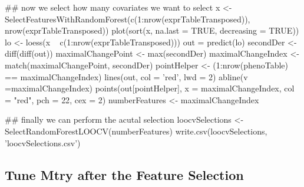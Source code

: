 \documentclass[]{article}
\newenvironment{Shaded}{\begin{snugshade}}{\end{snugshade}}
\newcommand{\CommentTok}[1]{\textcolor[rgb]{0.50,0.62,0.50}{#1}}
\newcommand{\DataTypeTok}[1]{\textcolor[rgb]{0.87,0.87,0.75}{#1}}
\newcommand{\DecValTok}[1]{\textcolor[rgb]{0.86,0.86,0.80}{#1}}
\newcommand{\KeywordTok}[1]{\textcolor[rgb]{0.94,0.87,0.69}{#1}}
\newcommand{\NormalTok}[1]{\textcolor[rgb]{0.80,0.80,0.80}{#1}}
\newcommand{\OperatorTok}[1]{\textcolor[rgb]{0.94,0.94,0.82}{#1}}
\newcommand{\OtherTok}[1]{\textcolor[rgb]{0.94,0.94,0.56}{#1}}
\newcommand{\StringTok}[1]{\textcolor[rgb]{0.80,0.58,0.58}{#1}}
\begin{document}
\begin{Shaded}
\begin{Highlighting}[]
\CommentTok{## now we select how many covariates we want to select}
\NormalTok{x <-}\StringTok{ }\KeywordTok{SelectFeaturesWithRandomForest}\NormalTok{(}\KeywordTok{c}\NormalTok{(}\DecValTok{1}\OperatorTok{:}\KeywordTok{nrow}\NormalTok{(exprTableTransposed)),}
                                    \KeywordTok{nrow}\NormalTok{(exprTableTransposed))}
\KeywordTok{plot}\NormalTok{(}\KeywordTok{sort}\NormalTok{(x, }\DataTypeTok{na.last =} \OtherTok{TRUE}\NormalTok{, }\DataTypeTok{decreasing =} \OtherTok{TRUE}\NormalTok{))}
\NormalTok{lo <-}\StringTok{ }\KeywordTok{loess}\NormalTok{(x }\OperatorTok{~}\StringTok{ }\KeywordTok{c}\NormalTok{(}\DecValTok{1}\OperatorTok{:}\KeywordTok{nrow}\NormalTok{(exprTableTransposed)))}
\NormalTok{out =}\StringTok{ }\KeywordTok{predict}\NormalTok{(lo)}
\NormalTok{secondDer <-}\StringTok{ }\KeywordTok{diff}\NormalTok{(}\KeywordTok{diff}\NormalTok{(out))}
\NormalTok{maximalChangePoint <-}\StringTok{ }\KeywordTok{max}\NormalTok{(secondDer)}
\NormalTok{maximalChangeIndex <-}\StringTok{ }\KeywordTok{match}\NormalTok{(maximalChangePoint, secondDer)}
\NormalTok{pointHelper <-}\StringTok{ }\NormalTok{(}\DecValTok{1}\OperatorTok{:}\KeywordTok{nrow}\NormalTok{(phenoTable) }\OperatorTok{==}\StringTok{ }\NormalTok{maximalChangeIndex)}
\KeywordTok{lines}\NormalTok{(out, }\DataTypeTok{col =} \StringTok{'red'}\NormalTok{, }\DataTypeTok{lwd =} \DecValTok{2}\NormalTok{)}
\KeywordTok{abline}\NormalTok{(}\DataTypeTok{v =}\NormalTok{maximalChangeIndex)}
\KeywordTok{points}\NormalTok{(out[pointHelper], }\DataTypeTok{x =}\NormalTok{ maximalChangeIndex, }\DataTypeTok{col =} \StringTok{"red"}\NormalTok{, }\DataTypeTok{pch =} \DecValTok{22}\NormalTok{, }\DataTypeTok{cex =} \DecValTok{2}\NormalTok{)}
\NormalTok{numberFeatures <-}\StringTok{ }\NormalTok{maximalChangeIndex}



\CommentTok{## finally we can perform the acutal selection}
\NormalTok{loocvSelections <-}\StringTok{ }\KeywordTok{SelectRandomForestLOOCV}\NormalTok{(numberFeatures)}
\KeywordTok{write.csv}\NormalTok{(loocvSelections, }\StringTok{'loocvSelections.csv'}\NormalTok{)}
\end{Highlighting}
\end{Shaded}

\hypertarget{tune-mtry-after-the-feature-selection}{%
\subsection{Tune Mtry after the Feature
Selection}\label{tune-mtry-after-the-feature-selection}}
\end{document}

